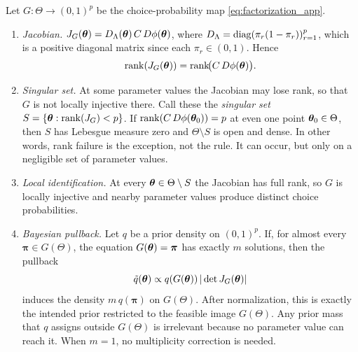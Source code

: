 \begin{theorem}
\label{thm:choice_prob_id}
Let $G \colon \Theta \to (0,1)^p$ be the choice-probability map
\eqref{eq:factorization_app}.
\begin{enumerate}
  \item \textit{Jacobian.} $J_G(\boldsymbol{\theta}) =
    D_\Lambda(\boldsymbol{\theta})\,C\,D\phi(\boldsymbol{\theta})$, where
    $D_\Lambda = \operatorname{diag}(\pi_r(1-\pi_r))_{r=1}^p$, which is a
    positive diagonal matrix since each $\pi_r \in (0,1)$. Hence
    \begin{equation}\label{eq:rank_equiv_app}
      \operatorname{rank}(J_G(\boldsymbol{\theta}))
      = \operatorname{rank}\!\bigl(C\,D\phi(\boldsymbol{\theta})\bigr).
    \end{equation}
  \item \textit{Singular set.} At some parameter values the
    Jacobian may lose rank, so that $G$ is not locally injective
    there. Call these the \textit{singular set}
    $S = \{\boldsymbol{\theta} :
      \operatorname{rank}(J_G) < p\}$. If
    $\operatorname{rank}(C\,D\phi(\boldsymbol{\theta}_0)) = p$ at even
    one point $\boldsymbol{\theta}_0 \in \Theta$, then $S$ has Lebesgue
    measure zero and $\Theta \setminus S$ is open and dense. In other
    words, rank failure is the exception, not the rule. It can occur,
    but only on a negligible set of parameter values.
  \item \textit{Local identification.} At every
    $\boldsymbol{\theta} \in \Theta \setminus S$ the Jacobian has full
    rank, so $G$ is locally injective and nearby parameter values produce
    distinct choice probabilities.
  \item \textit{Bayesian pullback.} Let $q$ be a prior density on
    $(0,1)^p$. If, for almost every
    $\boldsymbol{\pi} \in G(\Theta)$, the equation
    $G(\boldsymbol{\theta}) = \boldsymbol{\pi}$ has exactly $m$
    solutions, then the pullback
    \begin{equation}
      \tilde q(\boldsymbol{\theta})
      \propto
      q(G(\boldsymbol{\theta}))\,|\det J_G(\boldsymbol{\theta})|
    \end{equation}
    induces the density $m\,q(\boldsymbol{\pi})$ on $G(\Theta)$.
    After normalization, this is exactly the intended prior restricted
    to the feasible image $G(\Theta)$. Any prior mass that $q$ assigns
    outside $G(\Theta)$ is irrelevant because no parameter value can
    reach it. When $m = 1$, no multiplicity correction is needed.
\end{enumerate}
\end{theorem}

